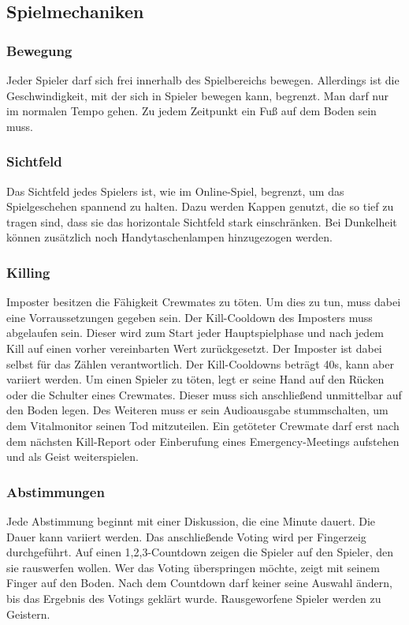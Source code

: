 \subsection{Spielmechaniken}
\subsubsection{Bewegung}
Jeder Spieler darf sich frei innerhalb des Spielbereichs bewegen. Allerdings
ist die Geschwindigkeit, mit der sich in Spieler bewegen kann, begrenzt. Man
darf nur im normalen Tempo gehen. Zu jedem Zeitpunkt ein Fuß auf dem Boden sein
muss.

\subsubsection{Sichtfeld}
Das Sichtfeld jedes Spielers ist, wie im Online-Spiel, begrenzt, um das
Spielgeschehen spannend zu halten. Dazu werden Kappen genutzt, die so
tief zu tragen sind, dass sie das horizontale Sichtfeld stark einschränken. Bei
Dunkelheit können zusätzlich noch Handytaschenlampen hinzugezogen werden.

\subsubsection{Killing}
Imposter besitzen die Fähigkeit Crewmates zu töten. Um dies zu tun, muss dabei
eine Vorraussetzungen gegeben sein. Der Kill-Cooldown des Imposters muss
abgelaufen sein. Dieser wird zum Start jeder Hauptspielphase und nach jedem Kill
auf einen vorher vereinbarten Wert zurückgesetzt. Der Imposter ist dabei selbst
für das Zählen verantwortlich. Der Kill-Cooldowns beträgt 40s, kann aber
variiert werden.
\newline
Um einen Spieler zu töten, legt er seine Hand auf den Rücken oder die Schulter
eines Crewmates. Dieser muss sich anschließend unmittelbar auf den Boden legen.
Des Weiteren muss er sein Audioausgabe stummschalten, um dem Vitalmonitor seinen
Tod mitzuteilen.
\newline
Ein getöteter Crewmate darf erst nach dem nächsten Kill-Report oder Einberufung
eines Emergency-Meetings aufstehen und als Geist weiterspielen.

\subsubsection{Abstimmungen}
Jede Abstimmung beginnt mit einer Diskussion, die eine Minute dauert. Die Dauer
kann variiert werden.
Das anschließende Voting wird per Fingerzeig durchgeführt. Auf
einen 1,2,3-Countdown zeigen die Spieler auf den Spieler, den sie
rauswerfen wollen. Wer das Voting überspringen möchte, zeigt mit seinem Finger
auf den Boden. Nach dem Countdown darf keiner seine Auswahl ändern, bis das
Ergebnis des Votings geklärt wurde.
\newline
Rausgeworfene Spieler werden zu Geistern.

